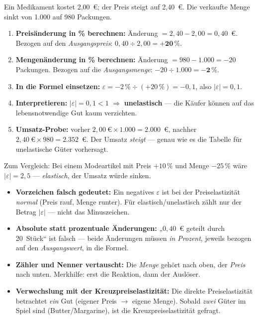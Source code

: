 \documentclass[11pt, a4paper]{article}
\begin{document}
\begin{beispiel}[title={SCHRITT FÜR SCHRITT: PREISELASTIZITÄT BERECHNEN}]
Ein Medikament kostet 2,00~€; der Preis steigt auf 2,40~€. Die verkaufte Menge sinkt
von 1.000 auf 980 Packungen.
\begin{enumerate}
  \item \textbf{Preisänderung in \% berechnen:} Änderung $= 2{,}40 - 2{,}00 = 0{,}40$~€.
    Bezogen auf den \emph{Ausgangspreis}: $0{,}40 \div 2{,}00 = \mathbf{+20\,\%}$.
  \item \textbf{Mengenänderung in \% berechnen:} Änderung $= 980 - 1.000 = -20$ Packungen.
    Bezogen auf die \emph{Ausgangsmenge}: $-20 \div 1.000 = \mathbf{-2\,\%}$.
  \item \textbf{In die Formel einsetzen:}
    $\varepsilon = -2\,\% \div (+20\,\%) = -0{,}1$, also $|\varepsilon| = 0{,}1$.
  \item \textbf{Interpretieren:} $|\varepsilon| = 0{,}1 < 1$ $\Rightarrow$
    \textbf{unelastisch} --- die Käufer können auf das lebensnotwendige Gut kaum
    verzichten.
  \item \textbf{Umsatz-Probe:} vorher $2{,}00~\text{€} \times 1.000 = 2.000$~€,
    nachher $2{,}40~\text{€} \times 980 = 2.352$~€. Der Umsatz \emph{steigt} --- genau
    wie es die Tabelle für unelastische Güter vorhersagt.
\end{enumerate}
Zum Vergleich: Bei einem Modeartikel mit Preis $+10\,\%$ und Menge $-25\,\%$ wäre
$|\varepsilon| = 2{,}5$ --- \emph{elastisch}, der Umsatz würde sinken.
\end{beispiel}

\begin{achtung}[title={TYPISCHE FEHLER BEI DER PREISELASTIZITÄT}]
\begin{itemize}
  \item \textbf{Vorzeichen falsch gedeutet:} Ein negatives $\varepsilon$ ist bei der
    Preiselastizität \emph{normal} (Preis rauf, Menge runter). Für
    elastisch/unelastisch zählt nur der Betrag $|\varepsilon|$ --- nicht das
    Minuszeichen.
  \item \textbf{Absolute statt prozentuale Änderungen:} „$0{,}40$~€ geteilt durch
    20~Stück`` ist falsch --- beide Änderungen müssen \emph{in Prozent}, jeweils
    bezogen auf den \emph{Ausgangswert}, in die Formel.
  \item \textbf{Zähler und Nenner vertauscht:} Die \emph{Menge} gehört nach oben,
    der \emph{Preis} nach unten. Merkhilfe: erst die Reaktion, dann der Auslöser.
  \item \textbf{Verwechslung mit der Kreuzpreiselastizität:} Die direkte
    Preiselastizität betrachtet \emph{ein} Gut (eigener Preis $\rightarrow$ eigene
    Menge). Sobald \emph{zwei} Güter im Spiel sind (Butter/Margarine), ist die
    Kreuzpreiselastizität gefragt.
\end{itemize}
\end{achtung}
\end{document}
